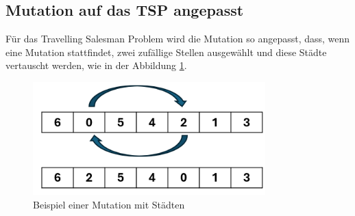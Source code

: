 \subsection{Mutation auf das TSP angepasst
\label{buch:paper:varalg:subsection:mutation_tsp}}
Für das Travelling Salesman Problem wird die Mutation so angepasst,
dass, wenn eine Mutation stattfindet, zwei zufällige Stellen ausgewählt
und diese Städte vertauscht werden, 
wie in der Abbildung \ref{fig:mutation_genetic_string_cities}.
\begin{figure}
	\centering
	\includegraphics[width=0.8\textwidth]{
        papers/varalg/images/teil3/09GeneticStringCitiesMutation.png
        }
	\caption{Beispiel einer Mutation mit Städten}
	\label{fig:mutation_genetic_string_cities}
\end{figure}
